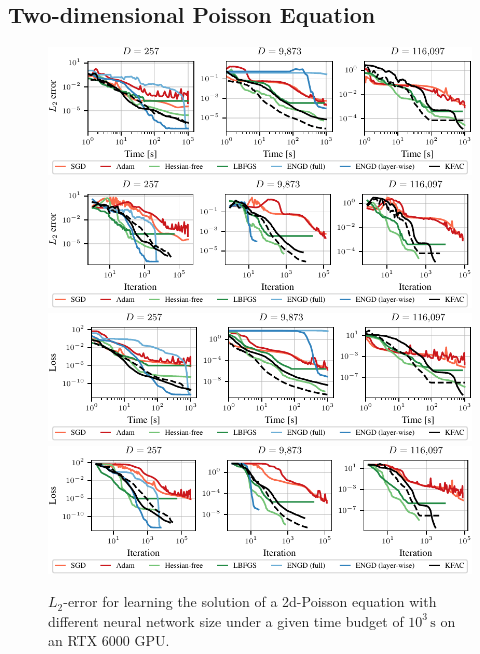 
\subsection{Two-dimensional Poisson Equation}

\begin{figure}[!h]
  \centering
  \includegraphics{../kfac_pinns_exp/exp17_groupplot_poisson2d/l2_error_over_time.pdf}
  \includegraphics{../kfac_pinns_exp/exp17_groupplot_poisson2d/l2_error_over_step.pdf}
  \includegraphics{../kfac_pinns_exp/exp17_groupplot_poisson2d/loss_over_time.pdf}
  \includegraphics{../kfac_pinns_exp/exp17_groupplot_poisson2d/loss_over_step.pdf}
  \caption{$L_2$-error for learning the solution of a 2d-Poisson equation with different neural network size under a given time budget of $10^3\,\text{s}$ on an RTX 6000 GPU.}
\end{figure}

